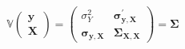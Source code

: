 \begin{equation}
	\mathbb{V}
	\left(
		\begin{array}{c}
			\mathbf{y} \\
			\mathbf{X} 
		\end{array}
	\right)
	=
	\left(
		\begin{array}{c|c}
			\sigma_{Y}^{2}                               & \boldsymbol{\sigma}_{\mathbf{y}, \mathbf{X}}^{\prime} \\
			\hline
			\boldsymbol{\sigma}_{\mathbf{y}, \mathbf{X}} & \boldsymbol{\Sigma}_{\mathbf{X}, \mathbf{X}}          
		\end{array}
	\right)
	=
	\boldsymbol{\Sigma}
	\label{eq:strRegression-expected-covariances}
\end{equation}
